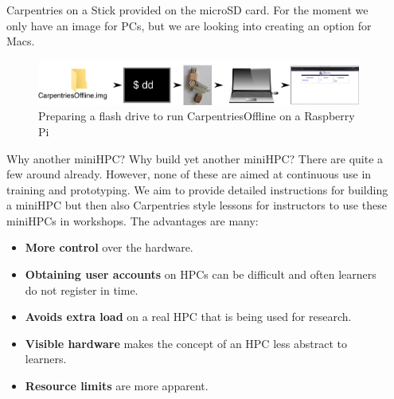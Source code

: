 \documentclass[final,20pt]{beamer}
\newlength{\sepwidth}
\newlength{\colwidth}
\newcommand{\separatorcolumn}{\begin{column}{\sepwidth}\end{column}}
\begin{document}
\begin{frame}[t]
\begin{columns}[t]
\begin{column}{\colwidth}
\begin{alertblock}{Carpentries on a Stick}
					provided on the microSD card. For the moment we only have an image for PCs, but we are looking into creating an option for Macs.
					\break
					\begin{center}
						\begin{figure}
							\includegraphics[width=0.9\columnwidth]{svg/flashdrive.png}
							\caption{Preparing a flash drive to run CarpentriesOffline on a Raspberry Pi}
						\end{figure}
					\end{center}
				\end{alertblock}
				\begin{alertblock}{Why another miniHPC?}
					Why build yet another miniHPC? There are quite a few around already. However, none of these 
					are aimed at continuous use in training and prototyping. We aim to provide detailed instructions
					for building a miniHPC but then also Carpentries style lessons for instructors to use these 
					miniHPCs in workshops. The advantages are many:
						\break
						\begin{itemize}
						\item \textbf{More control} over the hardware.
						\item \textbf{Obtaining user accounts} on HPCs can be difficult and often
						learners do not register in time.
						\item \textbf{Avoids extra load} on a real HPC that is being used for research.
						\item \textbf{Visible hardware} makes the concept of an HPC less abstract to learners.
						\item \textbf{Resource limits} are more apparent. 
						\break

						\break

					\end{itemize}
				\end{alertblock}		
			\end{column}
			\separatorcolumn
		\end{columns}
	

\end{frame}
\end{document}
